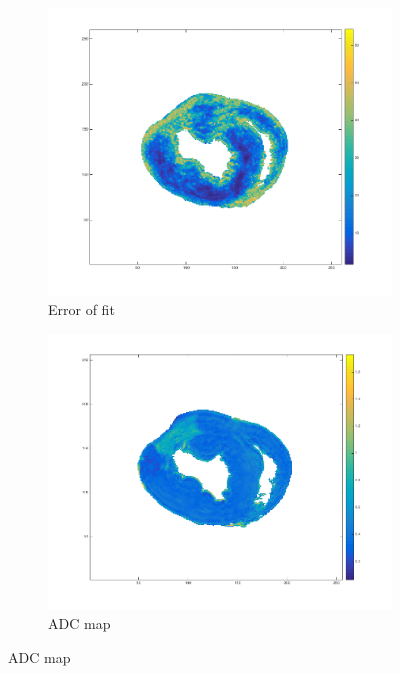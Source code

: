 \begin{figure}
    \centering
    \begin{subfigure}{.31\textwidth}
        \includegraphics[width=\textwidth]{figures/pig6_err_24}
        \caption{Error of fit}
        \label{fig:pig6_err}
    \end{subfigure}
    \begin{subfigure}{.31\textwidth}
        \includegraphics[width=\textwidth]{figures/pig6_adc_24}
        \caption{ADC map}
        \label{fig:pig6_adc}
    \end{subfigure}

\end{figure}
